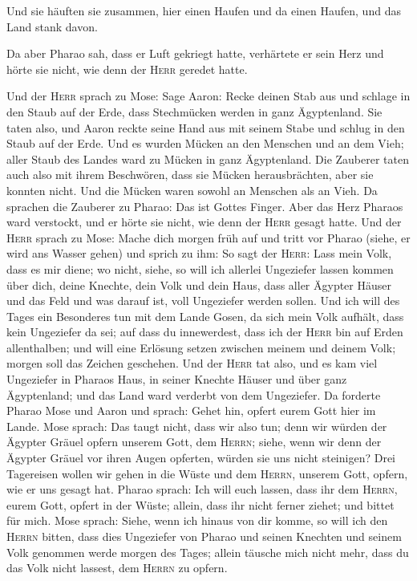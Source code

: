  Und sie häuften sie zusammen, hier einen Haufen und da
einen Haufen, und das Land stank davon.

 Da aber Pharao sah, dass er Luft gekriegt hatte,
verhärtete er sein Herz und hörte sie nicht, wie denn der \textsc{Herr}
geredet hatte.

 Und der \textsc{Herr} sprach zu Mose: Sage Aaron: Recke
deinen Stab aus und schlage in den Staub auf der Erde, dass Stechmücken
werden in ganz Ägyptenland.  Sie taten also, und Aaron
reckte seine Hand aus mit seinem Stabe und schlug in den Staub auf der
Erde. Und es wurden Mücken an den Menschen und an dem Vieh; aller Staub
des Landes ward zu Mücken in ganz Ägyptenland.  Die
Zauberer taten auch also mit ihrem Beschwören, dass sie Mücken
herausbrächten, aber sie konnten nicht. Und die Mücken waren sowohl an
Menschen als an Vieh.  Da sprachen die Zauberer zu
Pharao: Das ist Gottes Finger. Aber das Herz Pharaos ward verstockt, und
er hörte sie nicht, wie denn der \textsc{Herr} gesagt hatte.
 Und der \textsc{Herr} sprach zu Mose: Mache dich morgen
früh auf und tritt vor Pharao (siehe, er wird ans Wasser gehen) und
sprich zu ihm: So sagt der \textsc{Herr}: Lass mein Volk, dass es mir
diene;  wo nicht, siehe, so will ich allerlei Ungeziefer
lassen kommen über dich, deine Knechte, dein Volk und dein Haus, dass
aller Ägypter Häuser und das Feld und was darauf ist, voll Ungeziefer
werden sollen.  Und ich will des Tages ein Besonderes tun
mit dem Lande Gosen, da sich mein Volk aufhält, dass kein Ungeziefer da
sei; auf dass du innewerdest, dass ich der \textsc{Herr} bin auf Erden
allenthalben;  und will eine Erlösung setzen zwischen
meinem und deinem Volk; morgen soll das Zeichen geschehen.
 Und der \textsc{Herr} tat also, und es kam viel
Ungeziefer in Pharaos Haus, in seiner Knechte Häuser und über ganz
Ägyptenland; und das Land ward verderbt von dem Ungeziefer.
 Da forderte Pharao Mose und Aaron und sprach: Gehet hin,
opfert eurem Gott hier im Lande.  Mose sprach: Das taugt
nicht, dass wir also tun; denn wir würden der Ägypter Gräuel opfern
unserem Gott, dem \textsc{Herrn}; siehe, wenn wir denn der Ägypter
Gräuel vor ihren Augen opferten, würden sie uns nicht steinigen?
 Drei Tagereisen wollen wir gehen in die Wüste und dem
\textsc{Herrn}, unserem Gott, opfern, wie er uns gesagt hat.
 Pharao sprach: Ich will euch lassen, dass ihr dem
\textsc{Herrn}, eurem Gott, opfert in der Wüste; allein, dass ihr nicht
ferner ziehet; und bittet für mich.  Mose sprach: Siehe,
wenn ich hinaus von dir komme, so will ich den \textsc{Herrn} bitten,
dass dies Ungeziefer von Pharao und seinen Knechten und seinem Volk
genommen werde morgen des Tages; allein täusche mich nicht mehr, dass du
das Volk nicht lassest, dem \textsc{Herrn} zu opfern.

